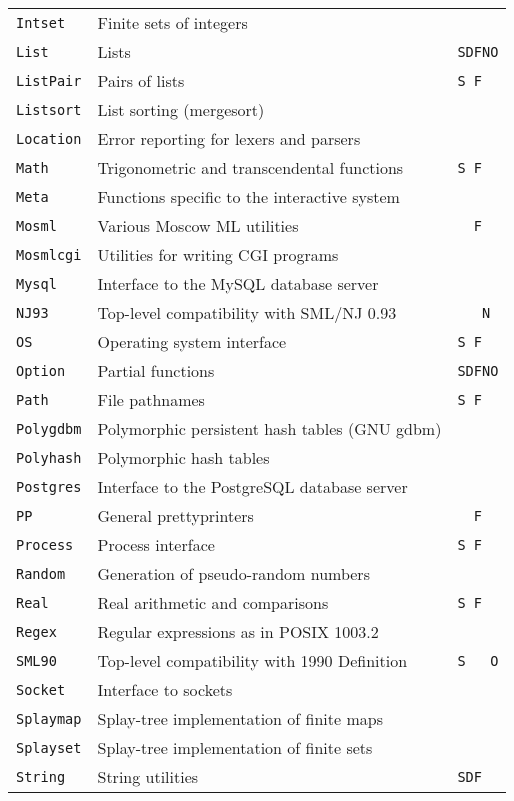 \documentclass[fleqn]{article}
\begin{document}
\begin{center}
\begin{tabular}{@{}|lll|}
{\tt Intset} & Finite sets of integers & \\
{\tt List}   & Lists & {\tt SDFNO}\\
{\tt ListPair} & Pairs of lists & {\tt S F}\\
{\tt Listsort} & List sorting (mergesort) & \\
{\tt Location} & Error reporting for lexers and parsers & \\
{\tt Math}   & Trigonometric and transcendental functions & {\tt S F}\\
{\tt Meta}   & Functions specific to the interactive system &\\
{\tt Mosml}  & Various Moscow ML utilities & {\tt \ \ F}\\
{\tt Mosmlcgi}  & Utilities for writing CGI programs & \\
{\tt Mysql}  & Interface to the MySQL database server & \\
{\tt NJ93}   & Top-level compatibility with SML/NJ 0.93 & {\tt \ \ \ N}\\
{\tt OS}     & Operating system interface & {\tt S F}\\
{\tt Option} & Partial functions & {\tt SDFNO}\\
{\tt Path}   & File pathnames & {\tt S F}\\
{\tt Polygdbm} & Polymorphic persistent hash tables (GNU gdbm) & \\
{\tt Polyhash} & Polymorphic hash tables & \\
{\tt Postgres} & Interface to the PostgreSQL database server & \\
{\tt PP}     & General prettyprinters & {\tt \ \ F}\\
{\tt Process} & Process interface & {\tt S F}\\
{\tt Random} & Generation of pseudo-random numbers & \\
{\tt Real}   & Real arithmetic and comparisons & {\tt S F}\\
{\tt Regex}  & Regular expressions as in POSIX 1003.2 & \\
{\tt SML90}    & Top-level compatibility with 1990 Definition & {\tt S\
  \ \ O}\\
{\tt Socket} & Interface to sockets & \\
{\tt Splaymap} & Splay-tree implementation of finite maps &\\
{\tt Splayset} & Splay-tree implementation of finite sets &\\
{\tt String} & String utilities & {\tt SDF}\\

\end{tabular}
\end{center}
\end{document}
